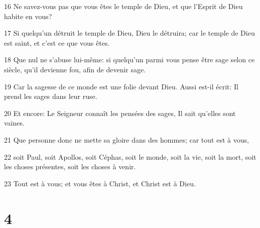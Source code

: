 \par 16 Ne savez-vous pas que vous êtes le temple de Dieu, et que l'Esprit de Dieu habite en vous?
\par 17 Si quelqu'un détruit le temple de Dieu, Dieu le détruira; car le temple de Dieu est saint, et c'est ce que vous êtes.
\par 18 Que nul ne s'abuse lui-même: si quelqu'un parmi vous pense être sage selon ce siècle, qu'il devienne fou, afin de devenir sage.
\par 19 Car la sagesse de ce monde est une folie devant Dieu. Aussi est-il écrit: Il prend les sages dans leur ruse.
\par 20 Et encore: Le Seigneur connaît les pensées des sages, Il sait qu'elles sont vaines.
\par 21 Que personne donc ne mette sa gloire dans des hommes; car tout est à vous,
\par 22 soit Paul, soit Apollos, soit Céphas, soit le monde, soit la vie, soit la mort, soit les choses présentes, soit les choses à venir.
\par 23 Tout est à vous; et vous êtes à Christ, et Christ est à Dieu.

\chapter{4}

